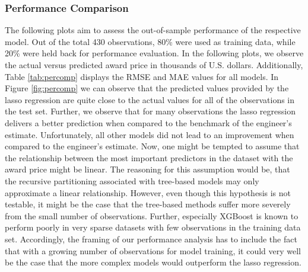 \documentclass[a4paper,12pt, headsepline]{scrartcl}
\numberwithin{equation}{section}
\begin{document}
\subsubsection{Performance Comparison}
The following plots aim to assess the out-of-sample performance of the respective model. Out of the total 430 observations, 80\% were used as training data, while 20\% were held back for performance evaluation. In the following plots, we observe the actual versus predicted award price in thousands of U.S. dollars. Additionally, Table \ref{tab:percomp} displays the RMSE and MAE values for all models. In Figure \ref{fig:percomp} we can observe that the predicted values provided by the lasso regression are quite close to the actual values for all of the observations in the test set. Further, we observe that for many observations the lasso regression delivers a better prediction when compared to the benchmark of the engineer's estimate. Unfortunately, all other models did not lead to an improvement when compared to the engineer's estimate. Now, one might be tempted to assume that the relationship between the most important predictors in the dataset with the award price might be linear. The reasoning for this assumption would be, that the recursive partitioning associated with tree-based models may only approximate a linear relationship. However, even though this hypothesis is not testable, it might be the case that the tree-based methods suffer more severely from the small number of observations. Further, especially XGBoost is known to perform poorly in very sparse datasets with few observations in the training data set. Accordingly, the framing of our performance analysis has to include the fact that with a growing number of observations for model training, it could very well be the case that the more complex models would outperform the lasso regression. 
\end{document}
